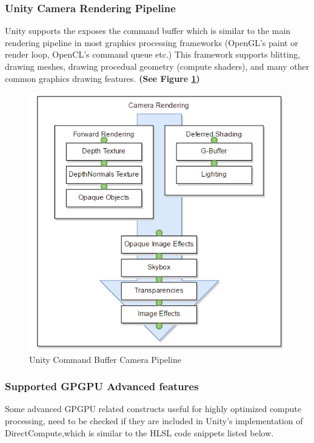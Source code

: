 \documentclass[a4paper,10pt,twoside]{article}
\begin{document}
\pagebreak


\subsubsection{Unity Camera Rendering Pipeline}
Unity supports the exposes the command buffer which is similar to the main rendering pipeline in most graphics processing frameworks (OpenGL's paint or render loop, OpenCL's command queue etc.) This framework supports blitting, drawing meshes, drawing procedual geometry (compute shaders), and many other common graphics drawing features. \textbf{(See Figure \ref{fig:gpuPipe})}

\begin{figure}[H]
	\includegraphics[width=\linewidth,height=\paperheight,keepaspectratio]{cameraRender.png}
	\caption{Unity Command Buffer Camera Pipeline}
	\label{fig:gpuPipe}
	\end{figure}

\pagebreak

\subsubsection{Supported GPGPU Advanced features}
Some advanced GPGPU related constructs useful for highly optimized compute processing, need to be checked if they are included in Unity's implementation of DirectCompute,which 
is similar to the HLSL code snippets listed below.
\end{document}
